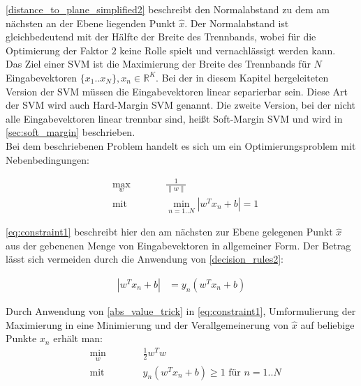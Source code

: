 \documentclass[a4paper,11pt,twoside]{scrreprt}
\newcommand{\norm}[1]{\lVert#1\rVert}
\begin{document}
\autoref{distance_to_plane_simplified2} beschreibt den Normalabstand zu dem am nächsten an der Ebene liegenden Punkt $\hat{x}$. Der Normalabstand ist gleichbedeutend mit der Hälfte der Breite des Trennbands, wobei für die Optimierung der Faktor $2$ keine Rolle spielt und vernachlässigt werden kann. \\
Das Ziel einer \ac{SVM} ist die Maximierung der Breite des Trennbands für $N$ Eingabevektoren $\{x_{1}..x_{N}\}, x_{n} \in \mathbb{R}^{K}$. Bei der in diesem Kapitel hergeleiteten Version der \ac{SVM} müssen die Eingabevektoren linear separierbar sein. Diese Art der \ac{SVM} wird auch Hard-Margin SVM genannt. Die zweite Version, bei der nicht alle Eingabevektoren linear trennbar sind, heißt Soft-Margin SVM und wird in \autoref{sec:soft_margin} beschrieben. \\

Bei dem beschriebenen Problem handelt es sich um ein Optimierungsproblem mit Nebenbedingungen:

\begin{subequations}
	\begin{alignat}{2}
		&\!\max_{w}        &\qquad&  \frac{1}{\norm{w}} \label{eq:optProb}\\
		&\text{mit } &      & \min_{n=1..N} |w^{T} x_{n} + b| = 1 \label{eq:constraint1}
	\end{alignat}
\end{subequations}

\autoref{eq:constraint1} beschreibt hier den am nächsten zur Ebene gelegenen Punkt $\hat{x}$ aus der gebenenen Menge von Eingabevektoren in allgemeiner Form. Der Betrag lässt sich vermeiden durch die Anwendung von \autoref{decision_rules2}:

\begin{equation} \label{abs_value_trick}
	\begin{aligned}
		|w^{T} x_{n} + b| &= y_{n} (w^{T} x_{n} + b)
	\end{aligned}
\end{equation}


Durch Anwendung von \autoref{abs_value_trick} in \autoref{eq:constraint1}, Umformulierung der Maximierung in eine Minimierung und der Verallgemeinerung von $\hat{x}$ auf beliebige Punkte $x_{n}$ erhält man:
\begin{subequations}
	\begin{alignat}{2}
		&\!\min_{w}        &\qquad&  \frac{1}{2} w^{T} w \label{eq:optProb2}\\
		&\text{mit } &      & y_n (w^{T} x_{n} + b) \geq 1 \text{ für } n=1..N \label{eq:constraint12}
	\end{alignat}
\end{subequations}
\end{document}

